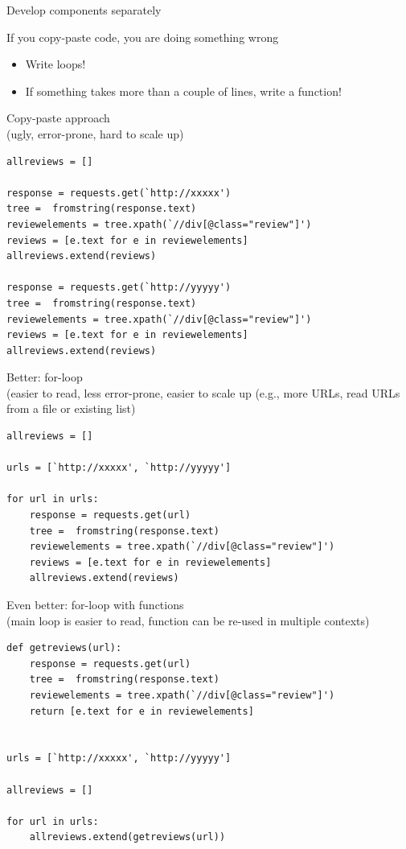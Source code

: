 \documentclass[compress]{beamer}
\begin{document}
\begin{frame}{Develop components separately}
	\begin{block}{If you copy-paste code, you are doing something wrong}
		\begin{itemize}[<+->]
			\item Write loops!
			\item If something takes more than a couple of lines, write a function!
		\end{itemize}
	\end{block}
\end{frame}

\begin{frame}
Copy-paste approach\\ (ugly, error-prone, hard to scale up)
\begin{lstlisting}
allreviews = []

response = requests.get(`http://xxxxx')
tree =  fromstring(response.text)
reviewelements = tree.xpath(`//div[@class="review"]')
reviews = [e.text for e in reviewelements]
allreviews.extend(reviews)

response = requests.get(`http://yyyyy')
tree =  fromstring(response.text)
reviewelements = tree.xpath(`//div[@class="review"]')
reviews = [e.text for e in reviewelements]
allreviews.extend(reviews)
\end{lstlisting}
\end{frame}


\begin{frame}
Better: for-loop\\ (easier to read, less error-prone, easier to scale up (e.g., more URLs, read URLs from a file or existing list)
\begin{lstlisting}
allreviews = []

urls = [`http://xxxxx', `http://yyyyy']

for url in urls:
    response = requests.get(url)
    tree =  fromstring(response.text)
    reviewelements = tree.xpath(`//div[@class="review"]')
    reviews = [e.text for e in reviewelements]
    allreviews.extend(reviews)
\end{lstlisting}
\end{frame}


\begin{frame}
Even better: for-loop with functions\\ (main loop is easier to read, function can be re-used in multiple contexts)
\begin{lstlisting}
def getreviews(url):
    response = requests.get(url)
    tree =  fromstring(response.text)
    reviewelements = tree.xpath(`//div[@class="review"]')
    return [e.text for e in reviewelements]


urls = [`http://xxxxx', `http://yyyyy']

allreviews = []

for url in urls:
    allreviews.extend(getreviews(url))
\end{lstlisting}
\end{frame}
\end{document}
